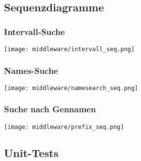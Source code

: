 \documentclass{scrartcl}
\begin{document}
\newpage
\subsection{Sequenzdiagramme}
\subsubsection{Intervall-Suche}
\texttt{[image: middleware/intervall\_seq.png]}
\subsubsection{Names-Suche}
\texttt{[image: middleware/namesearch\_seq.png]}
\subsubsection{Suche nach Gennamen}
\texttt{[image: middleware/prefix\_seq.png]}

\newpage
\subsection{Unit-Tests}
\end{document}
